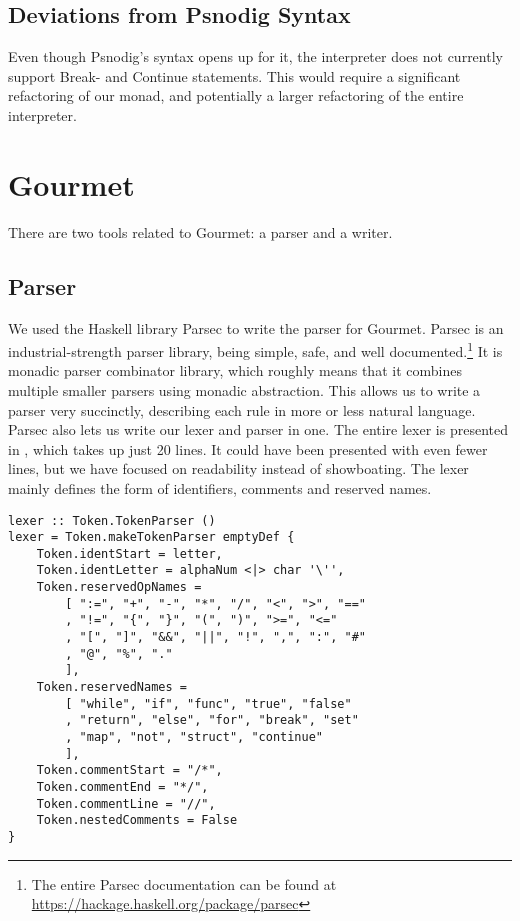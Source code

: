 \subsection{Deviations from Psnodig Syntax}

Even though Psnodig's syntax opens up for it, the interpreter does not currently support Break- and Continue statements. This would require a significant refactoring of our monad, and potentially a larger refactoring of the entire interpreter. \\

\section{Gourmet}

There are two tools related to Gourmet: a parser and a writer.

\subsection{Parser}

We used the Haskell library Parsec to write the parser for Gourmet. Parsec is an industrial-strength parser library, being simple, safe, and well documented.\footnote{The entire Parsec documentation can be found at \url{https://hackage.haskell.org/package/parsec}} It is monadic parser combinator library, which roughly means that it combines multiple smaller parsers using monadic abstraction. This allows us to write a parser very succinctly, describing each rule in more or less natural language. \\

Parsec also lets us write our lexer and parser in one. The entire lexer is presented in , which takes up just 20 lines. It could have been presented with even fewer lines, but we have focused on readability instead of showboating. The lexer mainly defines the form of identifiers, comments and reserved names. \\

\begin{lstlisting}[caption={The Gourmet lexer.}, captionpos=b, label={The Gourmet lexer.}]
lexer :: Token.TokenParser ()
lexer = Token.makeTokenParser emptyDef {
    Token.identStart = letter,
    Token.identLetter = alphaNum <|> char '\'',
    Token.reservedOpNames =
        [ ":=", "+", "-", "*", "/", "<", ">", "=="
        , "!=", "{", "}", "(", ")", ">=", "<="
        , "[", "]", "&&", "||", "!", ",", ":", "#"
        , "@", "%", "."
        ],
    Token.reservedNames =
        [ "while", "if", "func", "true", "false"
        , "return", "else", "for", "break", "set"
        , "map", "not", "struct", "continue"
        ],
    Token.commentStart = "/*",
    Token.commentEnd = "*/",
    Token.commentLine = "//",
    Token.nestedComments = False
}
\end{lstlisting}

